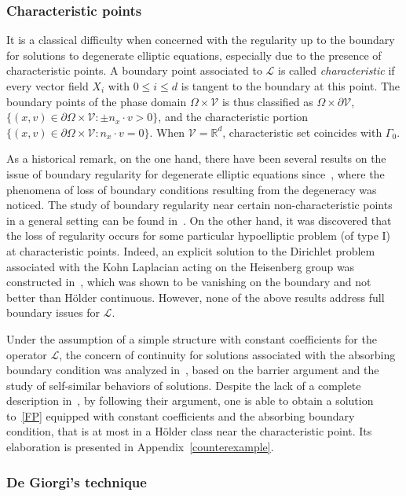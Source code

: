 \documentclass[10pt]{amsart}
\theoremstyle{definition}\newtheorem{defi}[theo]{Definition}\newtheorem{rema}[theo]{Remark}\newtheorem{exam}[theo]{Example}\newtheorem{exem}[theo]{Example}\newtheorem{nota}[theo]{Notation}
\newcommand*\p{\partial}
\newcommand*\R {\mathbb{R}}
\newcommand*\V {\mathcal{V}}
\newcommand{\scL}{\mathscr{L}}
\begin{document}
\subsubsection{Characteristic points}\label{chara}


It is a classical difficulty when concerned with the regularity up to the boundary for solutions to degenerate elliptic equations, especially due to the presence of characteristic points. A boundary point associated to $\scL$ is called \emph{characteristic} if every vector field $X_i$ with $0\le i\le d$ is tangent to the boundary at this point. The boundary points of the phase domain $\Omega\times\V$ is thus classified as $\Omega\times\p\V$, $\{(x,v)\in\p\Omega\times\V:\pm n_x\cdot v>0\}$, and the characteristic portion $\{(x,v)\in\p\Omega\times\V:n_x\cdot v=0\}$. When $\V=\R^d$, characteristic set coincides with $\Gamma_0$.

As a historical remark, on the one hand, there have been several results on the issue of boundary regularity for degenerate elliptic equations since~\cite{Fichera1,Keld}, where the phenomena of loss of boundary conditions resulting from the degeneracy was noticed. The study of boundary regularity near certain non-characteristic points in a general setting can be found in~\cite{KN1,Oleinik2}. On the other hand, it was discovered that the loss of regularity occurs for some particular hypoelliptic problem (of type I) at characteristic points. Indeed, an explicit solution to the Dirichlet problem associated with the Kohn Laplacian acting on the Heisenberg group was constructed in~\cite{Jerison}, which was shown to be vanishing on the boundary and not better than H\"older continuous. However, none of the above results address full boundary issues for $\scL$.

Under the assumption of a simple structure with constant coefficients for the operator $\scL$, the concern of continuity for solutions associated with the absorbing boundary condition was analyzed in~\cite{HJV}, based on the barrier argument and the study of self-similar behaviors of solutions. Despite the lack of a complete description in~\cite{HJV}, by following their argument, one is able to obtain a solution to~\eqref{FP} equipped with constant coefficients and the absorbing boundary condition, that is at most in a H\"older class near the characteristic point. Its elaboration is presented in Appendix~\ref{counterexample}.

\subsubsection{De Giorgi's technique}\label{dg}
\end{document}
